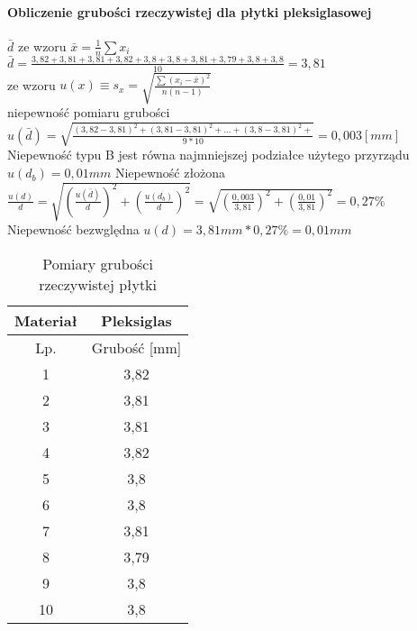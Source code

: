 \documentclass[a4paper,10pt,twoside]{article}
\begin{document}
		\paragraph{Obliczenie grubości rzeczywistej dla płytki pleksiglasowej}
		$\bar{d}$ ze wzoru $\bar{x} = \frac{1}{n} \sum x_i$ \\
		$\bar{d} = \frac{3,82 +
			3,81 +
			3,81 +
			3,82 +
			3,8 +
			3,8 + 
			3,81 +
			3,79 +
			3,8 +			
			3,8}{10} = 3,81
		$ \\
		ze wzoru $u(x) \equiv s_x = \sqrt{\frac{\sum(x_i - \bar{x})^2}{n(n-1)}}$ \\niepewność pomiaru grubości\\ $u(\bar{d}) = \sqrt{\frac{(3,82-3,81)^2 + (3,81 - 3,81)^2 + ... +(3,8 - 3,81)^2 +}{9*10}} = 0,003[mm] $
		\\ Niepewność typu B jest równa najmniejszej podziałce użytego przyrządu $u(d_b)= 0,01mm$
		Niepewność złożona $\frac{u(d)}{d} = \sqrt{(\frac{u(\bar{d})}{d})^2 + (\frac{u(d_b)}{d})^2} =\sqrt{(\frac{0,003}{3,81})^2 + (\frac{0,01}{3,81})^2} = 0,27\%$
		\\Niepewność bezwględna $u(d) = 3,81mm * 0,27\% = 0,01mm$  	
		\begin{table}[!htbp]
			\caption{Pomiary grubości rzeczywistej płytki}
			\begin{center}
			\begin{tabular}{|c|c|}
				\hline
				Materiał & Pleksiglas \\ \hline
				Lp. & Grubość {[}mm{]} \\ \hline
				1 & 3,82 \\ \hline
				2 & 3,81 \\ \hline
				3 & 3,81 \\ \hline
				4 & 3,82 \\ \hline
				5 & 3,8 \\ \hline
				6 & 3,8 \\ \hline
				7 & 3,81 \\ \hline
				8 & 3,79 \\ \hline
				9 & 3,8 \\ \hline
				10 & 3,8 \\ \hline
			\end{tabular}
		\end{center}
		\end{table}
\end{document}
